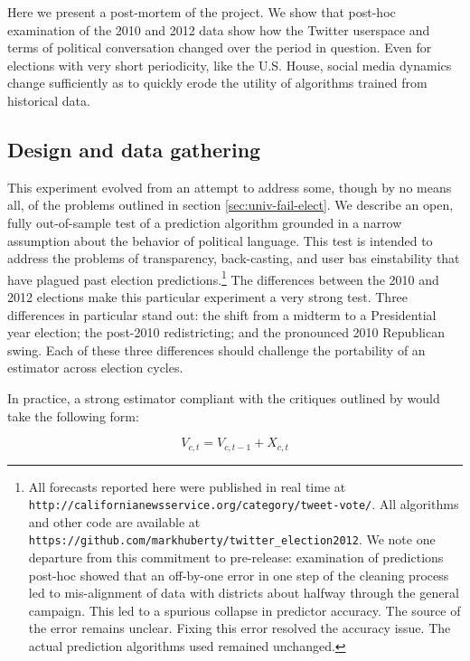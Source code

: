 \documentclass{article}
\begin{document}
Here we present a post-mortem of the project. We show that post-hoc
examination of the 2010 and 2012 data show how the Twitter userspace
and terms of political conversation changed over the period in
question. Even for elections with very short periodicity, like the
U.S. House, social media dynamics change sufficiently as to quickly
erode the utility of algorithms trained from historical data. 

\subsection{Design and data gathering}
\label{sec:design-data-gath}

This experiment evolved from an attempt to address some, though by no means
all, of the problems outlined in section \ref{sec:univ-fail-elect}. We describe an open, fully out-of-sample test
of a prediction algorithm grounded in a narrow assumption about the
behavior of political language. This test is intended to address the
problems of transparency, back-casting, and user bas einstability that
have plagued past election predictions.\footnote{All forecasts reported here were published in
real time at \texttt{http://californianewsservice.org/category/tweet-vote/}.  All
algorithms and other code are available at
\texttt{https://github.com/markhuberty/twitter\_election2012}. We note one departure from this commitment to
  pre-release: examination of predictions post-hoc showed that an
  off-by-one error in one step of the cleaning process led to
  mis-alignment of data with districts about halfway through the general
  campaign. This led to a spurious collapse in predictor accuracy. The
  source of the error remains unclear. Fixing this error resolved the
  accuracy issue. The actual prediction algorithms used remained
  unchanged.} 
The differences between the 2010 and 2012 elections make this
particular experiment a very strong test. Three differences in
particular stand out: the shift from a midterm to a Presidential year
election; the post-2010 redistricting; and the pronounced 2010
Republican swing. Each of these three differences should challenge the
portability of an estimator across election cycles.

In practice, a strong estimator compliant with the critiques outlined
by \cite{metaxas2011not} would take the following form:

\begin{equation}
  \label{eq:1}
  V_{c,t} = V_{c,t - 1} + X_{c,t}
\end{equation}
\end{document}
